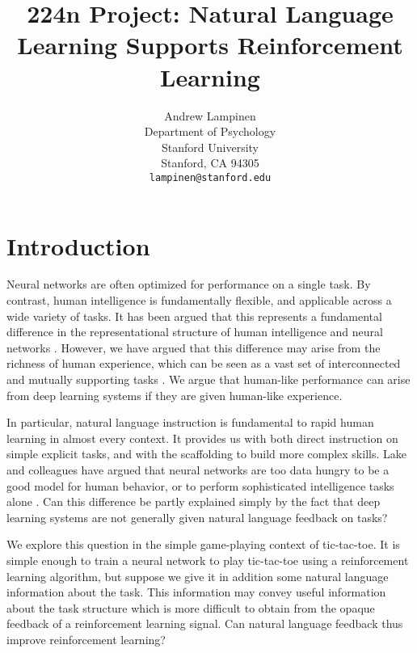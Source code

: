 \documentclass{article} %
\title{224n Project: Natural Language Learning Supports Reinforcement Learning}
\author{
Andrew Lampinen \\
Department of Psychology\\
Stanford University\\
Stanford, CA 94305 \\
\texttt{lampinen@stanford.edu} \\
}
\begin{document}
\maketitle

\begin{abstract}
\end{abstract}


\section{Introduction}
Neural networks are often optimized for performance on a single task. By contrast, human intelligence is fundamentally flexible, and applicable across a wide variety of tasks. It has been argued that this represents a fundamental difference in the representational structure of human intelligence and neural networks \cite{Lake2016}. However, we have argued that this difference may arise from the richness of human experience, which can be seen as a vast set of interconnected and mutually supporting tasks \cite{HansenInPress}. We argue that human-like performance can arise from deep learning systems if they are given human-like experience. \par
In particular, natural language instruction is fundamental to rapid human learning in almost every context. It provides us with both direct instruction on simple explicit tasks, and with the scaffolding to build more complex skills. Lake and colleagues have argued that neural networks are too data hungry to be a good model for human behavior, or to perform sophisticated intelligence tasks alone \cite{Lake2016}. Can this difference be partly explained simply by the fact that deep learning systems are not generally given natural language feedback on tasks? \par 
We explore this question in the simple game-playing context of tic-tac-toe. It is simple enough to train a neural network to play tic-tac-toe using a reinforcement learning algorithm, but suppose we give it in addition some natural language information about the task. This information may convey useful information about the task structure which is more difficult to obtain from the opaque feedback of a reinforcement learning signal. Can natural language feedback thus improve reinforcement learning? 
\end{document}
